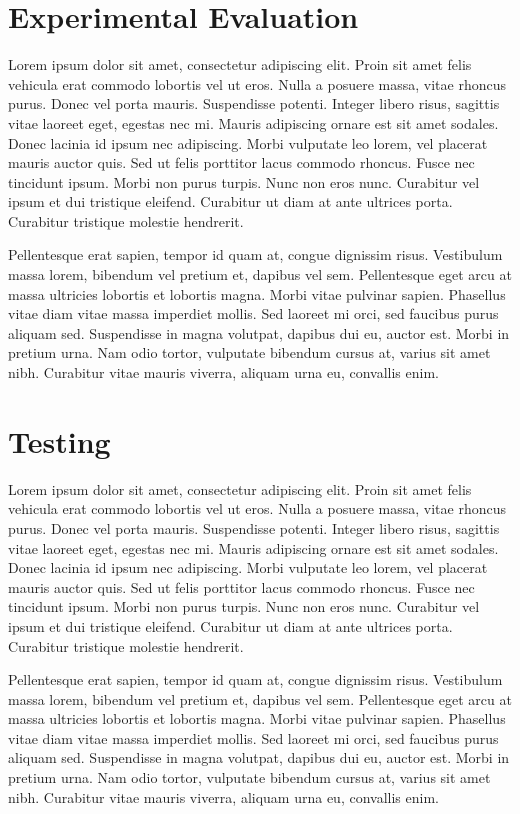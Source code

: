 \documentclass{vitmsprojectreport}
\begin{document}
\chapter{Experimental Evaluation}

Lorem ipsum dolor sit amet, consectetur adipiscing elit. Proin sit amet felis vehicula erat commodo lobortis vel ut eros. Nulla a posuere massa, vitae rhoncus purus. Donec vel porta mauris. Suspendisse potenti. Integer libero risus, sagittis vitae laoreet eget, egestas nec mi. Mauris adipiscing ornare est sit amet sodales. Donec lacinia id ipsum nec adipiscing. Morbi vulputate leo lorem, vel placerat mauris auctor quis. Sed ut felis porttitor lacus commodo rhoncus. Fusce nec tincidunt ipsum. Morbi non purus turpis. Nunc non eros nunc. Curabitur vel ipsum et dui tristique eleifend. Curabitur ut diam at ante ultrices porta. Curabitur tristique molestie hendrerit.

Pellentesque erat sapien, tempor id quam at, congue dignissim risus. Vestibulum massa lorem, bibendum vel pretium et, dapibus vel sem. Pellentesque eget arcu at massa ultricies lobortis et lobortis magna. Morbi vitae pulvinar sapien. Phasellus vitae diam vitae massa imperdiet mollis. Sed laoreet mi orci, sed faucibus purus aliquam sed. Suspendisse in magna volutpat, dapibus dui eu, auctor est. Morbi in pretium urna. Nam odio tortor, vulputate bibendum cursus at, varius sit amet nibh. Curabitur vitae mauris viverra, aliquam urna eu, convallis enim.

\chapter{Testing}

Lorem ipsum dolor sit amet, consectetur adipiscing elit. Proin sit amet felis vehicula erat commodo lobortis vel ut eros. Nulla a posuere massa, vitae rhoncus purus. Donec vel porta mauris. Suspendisse potenti. Integer libero risus, sagittis vitae laoreet eget, egestas nec mi. Mauris adipiscing ornare est sit amet sodales. Donec lacinia id ipsum nec adipiscing. Morbi vulputate leo lorem, vel placerat mauris auctor quis. Sed ut felis porttitor lacus commodo rhoncus. Fusce nec tincidunt ipsum. Morbi non purus turpis. Nunc non eros nunc. Curabitur vel ipsum et dui tristique eleifend. Curabitur ut diam at ante ultrices porta. Curabitur tristique molestie hendrerit.

Pellentesque erat sapien, tempor id quam at, congue dignissim risus. Vestibulum massa lorem, bibendum vel pretium et, dapibus vel sem. Pellentesque eget arcu at massa ultricies lobortis et lobortis magna. Morbi vitae pulvinar sapien. Phasellus vitae diam vitae massa imperdiet mollis. Sed laoreet mi orci, sed faucibus purus aliquam sed. Suspendisse in magna volutpat, dapibus dui eu, auctor est. Morbi in pretium urna. Nam odio tortor, vulputate bibendum cursus at, varius sit amet nibh. Curabitur vitae mauris viverra, aliquam urna eu, convallis enim.
\end{document}
